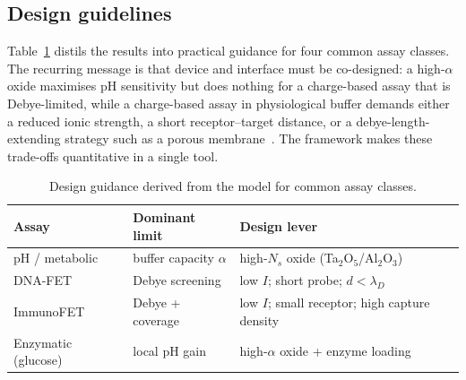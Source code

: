 \documentclass[10pt,journal]{IEEEtran}
\begin{document}
\subsection{Design guidelines}
Table~\ref{tab:guidelines} distils the results into practical guidance for four
common assay classes. The recurring message is that device and interface must be
co-designed: a high-$\alpha$ oxide maximises pH sensitivity but does nothing for
a charge-based assay that is Debye-limited, while a charge-based assay in
physiological buffer demands either a reduced ionic strength, a short
receptor--target distance, or a debye-length-extending strategy such as a porous
membrane~\cite{gao2015}. The framework makes these trade-offs quantitative in a
single tool.

\begin{table}[t]
\centering
\caption{Design guidance derived from the model for common assay classes.}
\label{tab:guidelines}
\footnotesize
\renewcommand{\arraystretch}{1.25}
\begin{tabular}{@{}p{1.6cm}p{2.0cm}p{3.2cm}@{}}
\toprule
Assay & Dominant limit & Design lever \\
\midrule
pH / metabolic & buffer capacity $\alpha$ & high-$N_s$ oxide (Ta$_2$O$_5$/Al$_2$O$_3$) \\
DNA-FET & Debye screening & low $I$; short probe; $d<\lambda_D$ \\
ImmunoFET & Debye + coverage & low $I$; small receptor; high capture density \\
Enzymatic (glucose) & local pH gain & high-$\alpha$ oxide + enzyme loading \\
\bottomrule
\end{tabular}
\end{table}
\end{document}
